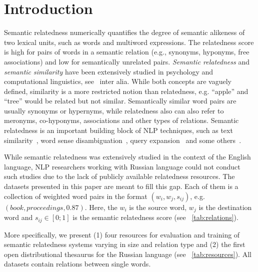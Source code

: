\documentclass[runningheads,a4paper]{llncs}
\begin{document}
\section{Introduction}

Semantic relatedness numerically quantifies the degree of semantic alikeness of two lexical units, such as words and multiword expressions. The relatedness score is high for pairs of words in a semantic relation (e.g., synonyms, hyponyms, free associations) and low for semantically unrelated pairs. \textit{Semantic relatedness} and \textit{semantic similarity} have been extensively studied in psychology and computational linguistics, see~\cite{Budanitsky:06,Pedersen:07,Gabrilovich:07,Batet:11} inter alia. While both concepts are vaguely defined, similarity is a more restricted notion than relatedness, e.g. ``apple'' and ``tree'' would be related but not similar. Semantically similar word pairs are usually synonyms or hypernyms, while relatedness also can also refer to meronyms, co-hyponyms, associations and other types of relations. Semantic relatedness is an important building block of NLP techniques, such as text similarity~\cite{Bar:12,Tsatsaronis:10}, word sense disambiguation~\cite{Patwardhan:03}, query expansion~\cite{Hsu:06} and some others~\cite{Panchenko:13}.

While semantic relatedness was extensively studied in the context of the English language,  NLP researchers working with Russian language could not conduct such studies due to the lack of publicly available relatedness resources. The datasets presented in this paper are meant to fill this gap. Each of them is a collection of weighted word pairs in the format  $(w_i,w_j,s_{ij})$, e.g.~$(\textit{book}, \textit{proceedings}, 0.87)$. Here, the $w_i$ is the source word, $w_j$ is the destination word and $s_{ij} \in [0;1]$ is the semantic relatedness score (see \tablename~\ref{tab:relations}). %

More specifically, we present (1) four resources for evaluation and training of semantic relatedness systems varying in size and relation type and (2) the first open distributional thesaurus for the Russian language (see \tablename~\ref{tab:resources}). All datasets contain relations between single words.
\end{document}
